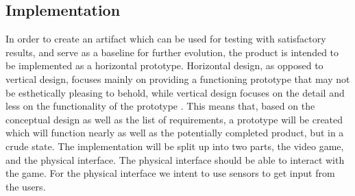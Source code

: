 \subsection{Implementation}
In order to create an artifact which can be used for testing with satisfactory results, and serve as a baseline for further evolution, the product is intended to be implemented as a horizontal prototype. Horizontal design, as opposed to vertical design, focuses mainly on providing a functioning prototype that may not be esthetically pleasing to behold, while vertical design focuses on the detail and less on the functionality of the prototype \parencite{Rogers2002}. This means that, based on the conceptual design as well as the list of requirements, a prototype will be created which will function nearly as well as the potentially completed product, but in a crude state. The implementation will be split up into two parts, the video game, and the physical interface. The physical interface should be able to interact with the game. For the physical interface we intent to use sensors to get input from the users.
